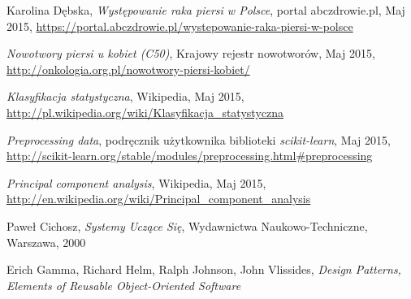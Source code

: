 \documentclass[../thesis.tex]{subfiles}
\begin{document}
\begin{thebibliography}{99}
\label{bibliography}

Karolina Dębska, \emph{Występowanie raka piersi w Polsce}, portal abczdrowie.pl, Maj 2015,  \url{https://portal.abczdrowie.pl/wystepowanie-raka-piersi-w-polsce}

\emph{Nowotwory piersi u kobiet (C50)}, Krajowy rejestr nowotworów, Maj 2015, \url{http://onkologia.org.pl/nowotwory-piersi-kobiet/}

\emph{Klasyfikacja statystyczna}, Wikipedia, Maj 2015, \url{http://pl.wikipedia.org/wiki/Klasyfikacja_statystyczna}

\emph{Preprocessing data}, podręcznik użytkownika biblioteki \emph{scikit-learn}, Maj 2015, \url{http://scikit-learn.org/stable/modules/preprocessing.html#preprocessing}

\emph{Principal component analysis}, Wikipedia, Maj 2015, \url{http://en.wikipedia.org/wiki/Principal_component_analysis}

Paweł Cichosz, \emph{Systemy Uczące Się}, Wydawnictwa Naukowo-Techniczne, Warszawa, 2000

Erich Gamma, Richard Helm, Ralph Johnson, John Vlissides,
\emph{Design Patterns, Elements of Reusable Object-Oriented Software}
				
\end{thebibliography}
\end{document}
